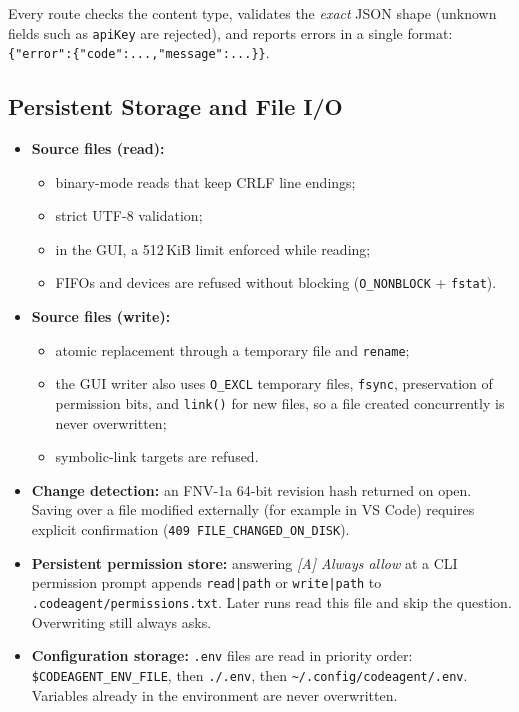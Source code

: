 \documentclass[12pt,a4paper,oneside]{book}
\begin{document}
Every route checks the content type, validates the \emph{exact} JSON shape
(unknown fields such as \texttt{apiKey} are rejected), and reports errors in a
single format: \texttt{\{"error":\{"code":...,\allowbreak{}"message":...\}\}}.

\subsection{Persistent Storage and File I/O}
\label{sec:ca-storage}

\begin{itemize}
  \item \textbf{Source files (read):}
    \begin{itemize}
      \item binary-mode reads that keep CRLF line endings;
      \item strict UTF-8 validation;
      \item in the GUI, a 512\,KiB limit enforced while reading;
      \item FIFOs and devices are refused without blocking
        (\texttt{O\_NONBLOCK} + \texttt{fstat}).
    \end{itemize}
  \item \textbf{Source files (write):}
    \begin{itemize}
      \item atomic replacement through a temporary file and
        \texttt{rename};
      \item the GUI writer also uses \texttt{O\_EXCL} temporary files,
        \texttt{fsync}, preservation of permission bits, and
        \texttt{link()} for new files, so a file created concurrently is
        never overwritten;
      \item symbolic-link targets are refused.
    \end{itemize}
  \item \textbf{Change detection:} an FNV-1a 64-bit revision hash returned on
    open. Saving over a file modified externally (for example in VS Code)
    requires explicit confirmation (\texttt{409 FILE\_CHANGED\_ON\_DISK}).
  \item \textbf{Persistent permission store:} answering \emph{[A] Always
    allow} at a CLI permission prompt appends \texttt{read|path} or
    \texttt{write|path} to \texttt{.codeagent/\allowbreak{}permissions.txt}. Later runs
    read this file and skip the question. Overwriting still always asks.
  \item \textbf{Configuration storage:} \texttt{.env} files are read in
    priority order: \texttt{\$CODEAGENT\_ENV\_FILE}, then \texttt{./\allowbreak{}.env},
    then \texttt{\textasciitilde/\allowbreak{}.config/\allowbreak{}codeagent/\allowbreak{}.env}. Variables already
    in the environment are never overwritten.
\end{itemize}
\end{document}
